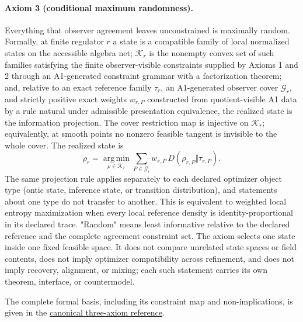 \paragraph{Axiom 3 (conditional maximum randomness).}
Everything that observer agreement leaves unconstrained is maximally random.
Formally, at finite regulator \(r\) a state is a compatible family of local
normalized states on the accessible algebra net; \(\mathcal K_r\) is the
nonempty convex set of such families satisfying the finite observer-visible
constraints supplied by Axioms 1 and 2 through an A1-generated constraint
grammar with a factorization theorem; and, relative to an exact reference
family \(\tau_r\), an A1-generated observer cover \(\mathcal G_r\), and
strictly positive exact weights \(w_{r,P}\) constructed from quotient-visible
A1 data by a rule natural under admissible presentation equivalence, the
realized state is the
information projection. The cover restriction map is injective on
\(\mathcal K_r\); equivalently, at smooth points no nonzero feasible
tangent is invisible to the whole cover. The realized state is
\[
\rho_r=\operatorname*{arg\,min}_{\rho\in\mathcal K_r}
\sum_{P\in\mathcal G_r} w_{r,P}\,D(\rho_{r,P}\Vert\tau_{r,P}).
\]
The same projection rule applies separately to each declared optimizer
object type (ontic state, inference state, or transition distribution), and
statements about one type do not transfer to another.
This is equivalent to weighted local entropy maximization when every local
reference density is identity-proportional in its declared trace. "Random"
means least informative relative to the
declared reference and the complete agreement constraint set. The axiom
selects one state inside one fixed feasible space. It does not compare
unrelated state spaces or field contents, does not imply optimizer
compatibility across refinement, and does not imply recovery, alignment, or
mixing; each such statement carries its own theorem, interface, or
countermodel.

The complete formal basis, including its constraint map and non-implications,
is given in the
\href{https://github.com/FloatingPragma/observer-patch-holography/blob/main/docs/AXIOM_REFERENCE.md}
{canonical three-axiom reference}.
